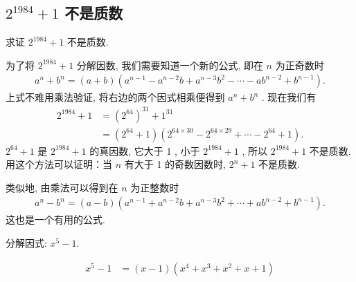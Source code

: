 \subsection{$2^{1984}+1$ 不是质数}

\begin{example}
	求证 $2^{1984}+1$ 不是质数.
\end{example}
\begin{solution}
	为了将 $2^{1984}+1$ 分解因数, 我们需要知道一个新的公式, 即在 $n$ 为正奇数时
	\begin{align*}
		a^{n}+b^{n}=(a+b)\left(a^{n-1}-a^{n-2} b+a^{n-3} b^{2}-\cdots-a b^{n-2}+b^{n-1}\right) .
	\end{align*}
	上式不难用乘法验证, 将右边的两个因式相乘便得到 $a^{n}+b^{n}$ . 现在我们有
	\begin{align*}
		2^{1984}+1 & = \left(2^{64}\right)^{31}+1^{31}                                                       \\
		           & = \left(2^{64}+1\right)\left(2^{64 \times 30}-2^{64 \times 29}+\cdots-2^{64}+1\right) .
	\end{align*}
	$2^{64}+1$ 是 $2^{1984}+1$ 的真因数, 它大于 1 , 小于 $2^{1984}+1$ , 所以 $2^{1984}+1$ 不是质数. 用这个方法可以证明：当 $n$ 有大于 1 的奇数因数时,  $2^{n}+1$ 不是质数.
\end{solution}
\begin{note}
	类似地, 由乘法可以得到在 $n$ 为正整数时
	\begin{align*}
		a^{n}-b^{n}=(a-b)\left(a^{n-1}+a^{n-2} b+a^{n-3} b^{2}+\cdots+a b^{n-2}+b^{n-1}\right) . \tag{12}
	\end{align*}
	这也是一个有用的公式.
\end{note}

\begin{example}
	分解因式: $x^{5}-1$.
\end{example}
\begin{solution}
	\begin{align*}
		x^{5}-1 & = (x-1)\left(x^{4}+x^{3}+x^{2}+x+1\right)
	\end{align*}
\end{solution}

